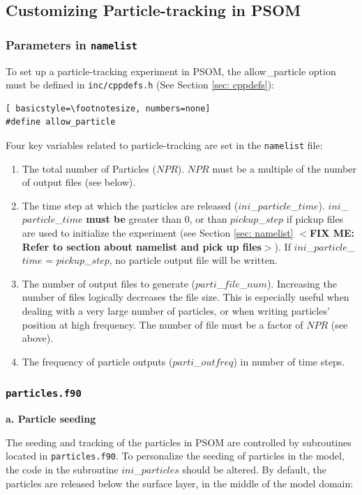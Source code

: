 \documentclass[12pt,letterpaper,titlepage]{article}
\newcommand{\fixme}[1]{\color{red}$<$\textbf{FIX ME: #1}$>$\color{black}}
\begin{document}
\subsection{Customizing Particle-tracking in PSOM}
\label{sec: myparticletracking}

\subsubsection{Parameters in \texttt{namelist}}
To set up a particle-tracking experiment in PSOM, the allow\_particle option must be defined in \texttt{inc/cppdefs.h} (See Section \ref{sec: cppdefs}):
\begin{lstlisting}[	basicstyle=\footnotesize, numbers=none]
#define allow_particle
\end{lstlisting}
Four key variables related to particle-tracking are set in the \texttt{namelist} file:
\begin{enumerate}
	\item The total number of Particles ($NPR$). $NPR$ must be a multiple of the number of output files (see below).
	\item The time step at which the particles are released ($ini$\_$particle$\_$time$). $ini$\_$particle$\_$time$ \textbf{must be} greater than 0, or than $pickup$\_$step$ if pickup files are used to initialize the experiment (see Section \ref{sec: namelist} \fixme{Refer to section about namelist and pick up files}). If $ini$\_$particle$\_$time$ = $pickup$\_$step$, no particle output file will be written.
	\item The number of output files to generate ($parti$\_$file$\_$num$). Increasing the number of files logically decreases the file size. This is especially useful when dealing with a very large number of particles, or when writing particles' position at high frequency. The number of file must be a factor of $NPR$ (see above).
	\item The frequency of particle outputs ($parti$\_$outfreq$) in number of time steps.
\end{enumerate}

\subsubsection{\texttt{particles.f90}}
\label{sec: perso_particles}

\textbf{\indent a. Particle seeding\\}

The seeding and tracking of the particles in PSOM are controlled by subroutines located in \texttt{particles.f90}. To personalize the seeding of particles in the model, the code in the subroutine $ini$\_$particles$ should be altered. By default, the particles are released below the surface layer, in the middle of the model domain:
\end{document}
